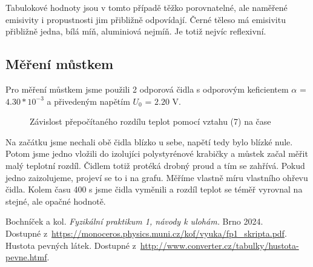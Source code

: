 \documentclass[a4paper,11pt]{article}
\begin{document}
Tabulokové hodnoty jsou v tomto případě těžko porovnatelné, ale naměřené emisivity i propustnosti jim přibližně odpovídají.
Černé těleso má emisivitu přibližně jedna, bílá míň, aluminiová nejmíň. Je totiž nejvíc reflexivní.

\subsection{Měření můstkem}

    Pro měření můstkem jsme použili 2 odporová čidla s odporovým keficientem $\alpha$ = $4.30 * 10 ^ {-3}$ 
    a přivedeným napětím  $U_0$ = $2.20$ V. 

\begin{figure}[ht]
  \centering
  
  \caption{ Závislost přepočítaného rozdílu teplot pomocí vztahu (7) na čase}
\end{figure}

Na začátku jsme nechali obě čidla blízko u sebe, napětí tedy bylo blízké nule. 
Potom jsme jedno vložili do izolujíci polystyrénové krabičky a můstek začal měřit malý teplotní rozdíl.
Čidlem totiž protéká drobný proud a tím se zahřívá. Pokud jedno zaizolujeme, projeví se to i na grafu. 
Měříme vlastně míru vlastního ohřevu čidla. Kolem času 400 s jsme čidla vyměnili a rozdíl teplot se téměř vyrovnal 
na stejné, ale opačné hodnotě.

\begin{thebibliography}{0}
 Bochníček a kol. \textit{Fyzikální praktikum 1, návody k ulohám.} Brno 2024.\\ Dostupné z~\url{https://monoceros.physics.muni.cz/kof/vyuka/fp1_skripta.pdf}.   
 Hustota pevných látek. Dostupné z~\url{http://www.converter.cz/tabulky/hustota-pevne.htmf}.   
\end{thebibliography}
\end{document}
